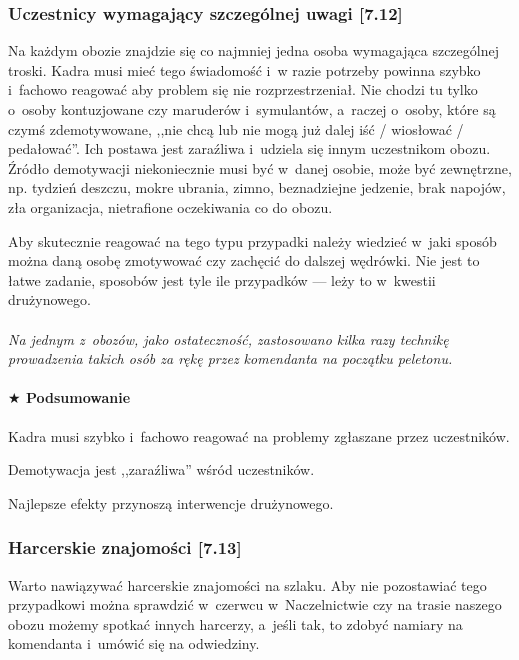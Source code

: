 \documentclass[a5paper,10pt,titlepage,twoside]{article}
\newcommand*{\thecheckbox}{\hss$\Box$} %
\newenvironment*{checklist}
{\list{}{%
\renewcommand*{\makelabel}[1]{\thecheckbox}}}
{\endlist}
\begin{document}
\subsubsection{Uczestnicy wymagający szczególnej uwagi [7.12]}
Na każdym obozie znajdzie się co najmniej jedna osoba wymagająca szczególnej troski. Kadra musi mieć tego świadomość i~w razie potrzeby powinna szybko i~fachowo reagować aby problem się nie rozprzestrzeniał. Nie chodzi tu tylko o~osoby kontuzjowane czy maruderów i~symulantów, a~raczej o~osoby, które są czymś zdemotywowane, ,,nie chcą lub nie mogą już dalej iść / wiosłować / pedałować''. Ich postawa jest zaraźliwa i~udziela się innym uczestnikom obozu. Źródło demotywacji niekoniecznie musi być w~danej osobie, może być zewnętrzne, np. tydzień deszczu, mokre ubrania, zimno, beznadziejne jedzenie, brak napojów, zła organizacja, nietrafione oczekiwania co do obozu.

Aby skutecznie reagować na tego typu przypadki należy wiedzieć w~jaki sposób można daną osobę zmotywować czy zachęcić do dalszej wędrówki. Nie jest to łatwe zadanie, sposobów jest tyle ile przypadków --- leży to w~kwestii drużynowego.
\\
\\
\small{
\emph{Na jednym z~obozów, jako ostateczność, zastosowano kilka razy technikę prowadzenia takich osób za rękę przez komendanta na początku peletonu.}}

\paragraph{$\bigstar$ Podsumowanie}
\begin{checklist}
\item Kadra musi szybko i~fachowo reagować na problemy zgłaszane przez uczestników.
\item Demotywacja jest ,,zaraźliwa'' wśród uczestników.
\item Najlepsze efekty przynoszą interwencje drużynowego.
\end{checklist}

\subsubsection{Harcerskie znajomości [7.13]}
Warto nawiązywać harcerskie znajomości na szlaku. Aby nie pozostawiać tego przypadkowi można sprawdzić w~czerwcu w~Naczelnictwie czy na trasie naszego obozu możemy spotkać innych harcerzy, a~jeśli tak, to zdobyć namiary na komendanta i~umówić się na odwiedziny.
\end{document}
